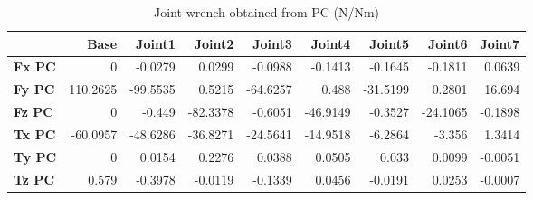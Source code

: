 \begin{table}[h!]
	\centering
	\caption{Joint wrench obtained from PC (N/Nm)}
	\label{wrech_PC_Pose11}
	\begin{tabular}{|l|r|r|r|r|r|r|r|r|}
		\hline
		\textbf{}  & \textbf{Base} & \textbf{Joint1}  & \textbf{Joint2}  & \textbf{Joint3}  & \textbf{Joint4}  & \textbf{Joint5}  & \textbf{Joint6}  & \textbf{Joint7} \\ \hline
		\textbf{Fx PC}  & 0        & -0.0279        & 0.0299        & -0.0988        & -0.1413        & -0.1645        & -0.1811        & 0.0639 \\ \hline
		\textbf{Fy PC}  & 110.2625        & -99.5535        & 0.5215        & -64.6257        & 0.488        & -31.5199        & 0.2801        & 16.694 \\ \hline
		\textbf{Fz PC}  & 0        & -0.449        & -82.3378        & -0.6051        & -46.9149        & -0.3527        & -24.1065        & -0.1898 \\ \hline
		\textbf{Tx PC}  & -60.0957        & -48.6286        & -36.8271        & -24.5641        & -14.9518        & -6.2864        & -3.356        & 1.3414 \\ \hline
		\textbf{Ty PC}  & 0        & 0.0154        & 0.2276        & 0.0388        & 0.0505        & 0.033        & 0.0099        & -0.0051 \\ \hline
		\textbf{Tz PC}  & 0.579        & -0.3978        & -0.0119        & -0.1339        & 0.0456        & -0.0191        & 0.0253        & -0.0007 \\ \hline
	\end{tabular}
\end{table}

